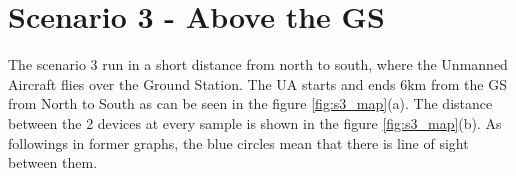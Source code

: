 \newpage
\section{Scenario 3 - Above the GS}\label{sec:scenario3}
The scenario 3 run in a short distance from north to south, where the Unmanned Aircraft flies over the Ground Station. The UA starts and ends 6km from the GS from North to South as can be seen in the figure \ref{fig:s3_map}(a). The distance between the 2 devices at every sample is shown in the figure \ref{fig:s3_map}(b). As followings in former graphs, the blue circles mean that there is line of sight between them. 


\begin{figure}[H]
	\centering

\end{figure}
